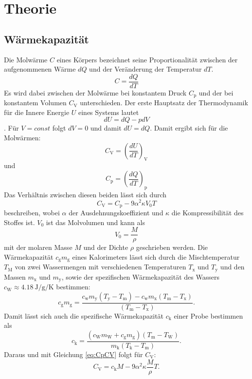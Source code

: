 
\section{Theorie}
\label{sec:Theorie}

\subsection{Wärmekapazität}
Die Molwärme $C$ eines Körpers bezeichnet seine Proportionalität zwischen der aufgenommenen Wärme $dQ$ und der Veränderung der Temperatur $dT$.
\begin{equation}
C = \frac{dQ}{dT} \label{eq:C}
\end{equation}
Es wird dabei zwischen der Molwärme bei konstantem Druck $C_\text{p}$ und der bei konstantem Volumen $C_\text{V}$  unterschieden.\newline
Der erste Hauptsatz der Thermodynamik für die Innere Energie $U$ eines Systems lautet \[dU=dQ-pdV\].
Für $V = const$ folgt $dV = 0$ und damit $dU = dQ$.
Damit ergibt sich für die Molwärmen:
\begin{equation}
C_\text{V} = \left(\frac{dU}{dT}\right)_\text{V} \label{eq:CV}
\end{equation}
und 
\begin{equation}
C_\text{p} = \left(\frac{dQ}{dT}\right)_\text{p} \label{eq:Cp}
\end{equation}
Das Verhältnis zwischen diesen beiden lässt sich durch
\begin{equation}
C_\text{V}= C_\text{p} - 9\alpha^2\kappa V_0T \label{eq:CpCV}
\end{equation}
beschreiben\cite{V201}, wobei $\alpha$ der Ausdehnungskoeffizient und $\kappa$ die Kompressibilität des Stoffes ist.
$V_0$ ist das Molvolumen und kann als 
\begin{equation*}
V_0 = \frac{M}{\rho}
\end{equation*}
mit der molaren Masse $M$ und der Dichte $\rho$ geschrieben werden.
Die Wärmekapazität $c_\text{g}m_\text{g}$ eines Kalorimeters lässt sich durch die Mischtemperatur $T_\text{M}$ von zwei Wassermengen mit verschiedenen Temperaturen $T_\text{x}$ und $T_\text{y}$ und den Massen $m_\text{x}$ und $m_\text{y}$, sowie der spezifischen Wärmekapazität des Wassers $c_\text{W}\approx \SI{4,18}{\joule\per\gram\per\kelvin}$ bestimmen\cite{V201}:
\begin{equation}
c_\text{g}m_\text{g} =\frac{ c_\text{w}m_\text{y}(T_\text{y}-T_\text{m})- c_\text{w}m_\text{x}(T_\text{m}-T_\text{x})}{(T_\text{m}-T_\text{x})}. \label{eq:cgmg}
\end{equation}
Damit lässt sich auch die spezifische Wärmekapazität $c_\text{k}$ einer Probe bestimmen als \cite{V201}
\begin{equation}
c_\text{k} =\frac{( c_\text{W}m_\text{W}+ c_\text{g}m_\text{g})(T_\text{m}-T_\text{W})}{m_\text{k}(T_\text{k}-T_\text{m})}. \label{eq:ck}
\end{equation}
Daraus und mit Gleichung \eqref{eq:CpCV} folgt für $C_\text{V}$: 
\begin{equation}
C_\text{V}= c_\text{k}M - 9\alpha^2\kappa \frac{M}{\rho}T. \label{eq:ckCV}
\end{equation}
